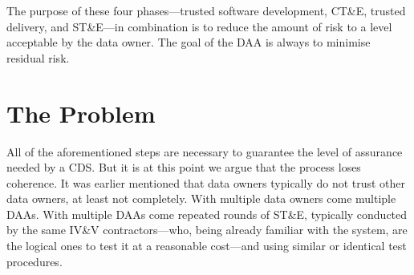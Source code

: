 \documentclass[10pt,letterpaper,conference,compsocconf]{IEEEtran}
\begin{document}
The purpose of these four phases---trusted software development,
CT\&E, trusted delivery, and ST\&E---in combination is to reduce
the amount of risk to a level acceptable by the data owner.
The goal of the DAA is always to minimise residual risk.

%
%


\section{The Problem}\label{the-problem}

All of the aforementioned steps are necessary to guarantee the level
of assurance needed by a CDS.  But it is at this point we argue that
the process loses coherence.  It was earlier mentioned that data owners
typically do not trust other data owners, at least not completely.  With
multiple data owners come multiple DAAs.  With multiple DAAs come repeated
rounds of ST\&E, typically conducted by the same IV\&V contractors---who,
being already familiar with the system, are the logical ones to test it
at a reasonable cost---and using similar or identical test procedures.
\end{document}
